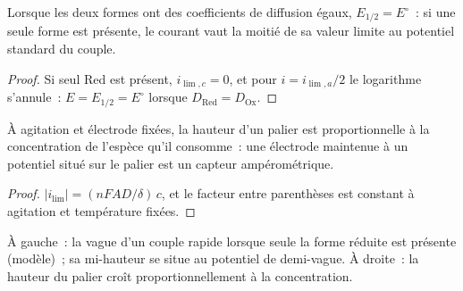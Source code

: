\begin{corollary}\label{cor:b2:current-potential-curves:half-wave}
Lorsque les deux formes ont des coefficients de diffusion égaux, $E_{1/2} = E^\circ$~: si
une seule forme est présente, le courant vaut la moitié de sa valeur limite au potentiel
standard du couple.
\end{corollary}

\begin{proof}
Si seul Red est présent, $i_{\lim,c} = 0$, et pour $i = i_{\lim,a}/2$ le logarithme
s'annule~: $E = E_{1/2} = E^\circ$ lorsque $D_{\text{Red}} = D_{\text{Ox}}$.
\end{proof}

\begin{proposition}\label{prop:b2:current-potential-curves:plateau}
À agitation et électrode fixées, la hauteur d'un palier est proportionnelle à la
concentration de l'espèce qu'il consomme~: une électrode maintenue à un
potentiel situé sur le palier est un capteur ampérométrique.
\end{proposition}

\begin{proof}
$|i_{\lim}| = (nFAD/\delta)\,c$, et le facteur entre parenthèses est constant à agitation
et température fixées.
\end{proof}

\begin{omfigure}
\hfill
{}

{\small À gauche~: la vague d'un couple rapide lorsque seule la forme réduite est présente
(modèle)~; sa mi-hauteur se situe au potentiel de demi-vague. À droite~: la hauteur
du palier croît proportionnellement à la concentration.}
\end{omfigure}

